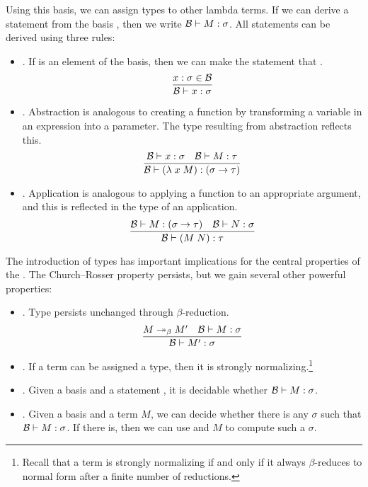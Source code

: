Using this basis, we can assign types to other lambda terms. If we can derive a statement  from the basis \basis, then we write $\basis \turnstile \stmt{M}{\sigma}$. All statements can be derived using three rules:
\begin{itemize}
\item {}. If  is an element of the basis, then we can make the statement that .
\[
    \frac{\stmt{x}{\sigma} \in \basis}{\basis \turnstile \stmt{x}{\sigma}}
\]

\item {}. Abstraction is analogous to creating a function by transforming a variable in an expression into a parameter. The type resulting from abstraction reflects this.
\[
    \frac{\basis \turnstile \stmt{x}{\sigma}\quad%
        \basis \turnstile \stmt{M}{\tau}}%
    {\basis \turnstile \stmt{(\lambda\; x\; M)}{(\sigma \to \tau)}}
\]

\item {}. Application is analogous to applying a function to an appropriate argument, and this is reflected in the type of an application.
\[
    \frac{\basis \turnstile \stmt{M}{(\sigma \to \tau)}\quad
        \basis \turnstile \stmt{N}{\sigma}}%
    {\basis \turnstile \stmt{(M\; N)}{\tau}}
\]
\end{itemize}

The introduction of types has important implications for the central properties of the \lambdacalc{}. The Church--Rosser property persists, but we gain several other powerful properties:
\begin{itemize}
\item {}. Type persists unchanged through $\beta$-re\-duc\-tion.
\[
\frac{M \betared[*] M\prime \quad \basis \turnstile \stmt{M}{\sigma}}%
{\basis \turnstile \stmt{M\prime}{\sigma}}
\]

\item {}. If a term can be assigned a type, then it is strongly normalizing.\footnote{Recall that a term is strongly normalizing if and only if it always $\beta$-reduces to normal form after a finite number of reductions.}

\item {}. Given a basis \basis{} and a statement , it is decidable whether $\basis \turnstile \stmt{M}{\sigma}$.

\item {}. Given a basis \basis{} and a term $M$, we can decide whether there is any $\sigma$ such that $\basis \turnstile \stmt{M}{\sigma}$. If there is, then we can use \basis{} and $M$ to compute such a $\sigma$.
\end{itemize}

